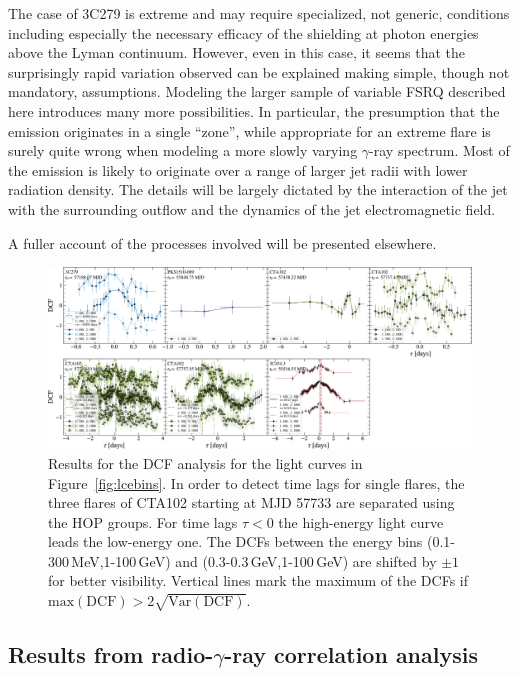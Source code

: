 \documentclass[twocolumn,linenumbers]{aastex62}
\newcommand{\gray}{$\gamma$-ray\xspace}
\begin{document}
The  case of 3C279 is extreme and may require specialized, not generic, conditions including especially the necessary efficacy of the shielding at photon energies above the Lyman continuum. However, even in this case, it seems that the surprisingly rapid variation observed can be explained making simple, though not mandatory, assumptions. Modeling the larger sample of variable FSRQ described here introduces many more possibilities. In particular, the presumption that the emission originates in a single ``zone'', while appropriate for an extreme flare is surely quite wrong when modeling a more slowly varying \gray spectrum. Most of the emission is likely to originate over a range of larger jet radii with lower radiation density. The details will be largely dictated by the interaction of the jet with the surrounding outflow and the dynamics of the jet electromagnetic field.

A fuller account of the processes involved will be presented elsewhere.

\begin{figure}
    \centering
    \includegraphics[width = .9 \linewidth]{zdcf_ebins.pdf}
    \caption{Results for the DCF analysis for the light curves in Figure~\ref{fig:lcebins}. In order to detect time lags for single flares, the three flares of CTA102 starting at MJD 57733 are separated using the HOP groups. For time lags $\tau < 0$ the high-energy light curve leads the low-energy one. The DCFs between the energy bins (0.1-300\,MeV,1-100\,GeV) and (0.3-0.3\,GeV,1-100\,GeV) are shifted by $\pm 1$ for better visibility. 
    Vertical lines mark the maximum of the DCFs if $\mathrm{max}(\mathrm{DCF}) > 2 \sqrt{\mathrm{Var}(\mathrm{DCF})}$.}
    \label{fig:zdcf}
\end{figure}

\subsection{Results from radio-\gray correlation analysis}
\label{sec:gammaradio}
\end{document}
